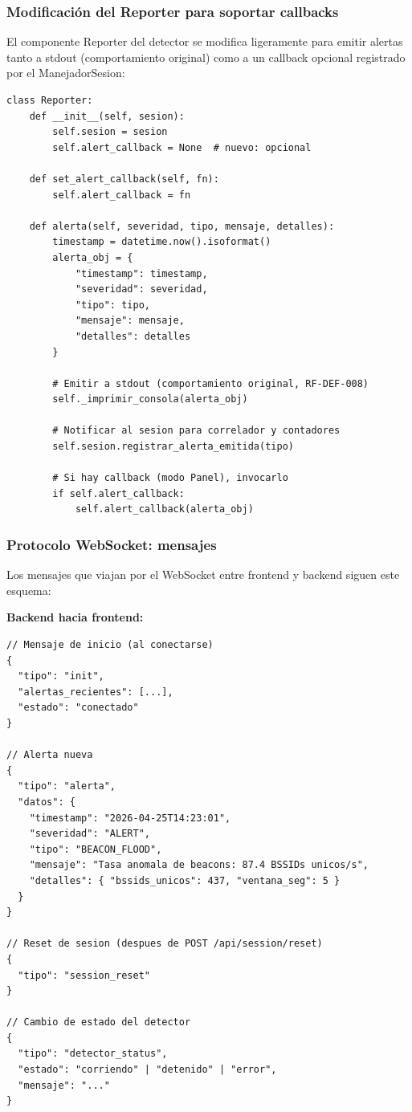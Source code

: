 \documentclass[11pt,a4paper]{article}
\begin{document}
\subsubsection{Modificación del Reporter para soportar callbacks}

El componente Reporter del detector se modifica ligeramente para emitir
alertas tanto a stdout (comportamiento original) como a un callback
opcional registrado por el ManejadorSesion:

\begin{lstlisting}
class Reporter:
    def __init__(self, sesion):
        self.sesion = sesion
        self.alert_callback = None  # nuevo: opcional

    def set_alert_callback(self, fn):
        self.alert_callback = fn

    def alerta(self, severidad, tipo, mensaje, detalles):
        timestamp = datetime.now().isoformat()
        alerta_obj = {
            "timestamp": timestamp,
            "severidad": severidad,
            "tipo": tipo,
            "mensaje": mensaje,
            "detalles": detalles
        }

        # Emitir a stdout (comportamiento original, RF-DEF-008)
        self._imprimir_consola(alerta_obj)

        # Notificar al sesion para correlador y contadores
        self.sesion.registrar_alerta_emitida(tipo)

        # Si hay callback (modo Panel), invocarlo
        if self.alert_callback:
            self.alert_callback(alerta_obj)
\end{lstlisting}

\subsubsection{Protocolo WebSocket: mensajes}

Los mensajes que viajan por el WebSocket entre frontend y backend siguen
este esquema:

\textbf{Backend hacia frontend:}

\begin{lstlisting}
// Mensaje de inicio (al conectarse)
{
  "tipo": "init",
  "alertas_recientes": [...],
  "estado": "conectado"
}

// Alerta nueva
{
  "tipo": "alerta",
  "datos": {
    "timestamp": "2026-04-25T14:23:01",
    "severidad": "ALERT",
    "tipo": "BEACON_FLOOD",
    "mensaje": "Tasa anomala de beacons: 87.4 BSSIDs unicos/s",
    "detalles": { "bssids_unicos": 437, "ventana_seg": 5 }
  }
}

// Reset de sesion (despues de POST /api/session/reset)
{
  "tipo": "session_reset"
}

// Cambio de estado del detector
{
  "tipo": "detector_status",
  "estado": "corriendo" | "detenido" | "error",
  "mensaje": "..."
}
\end{lstlisting}
\end{document}
